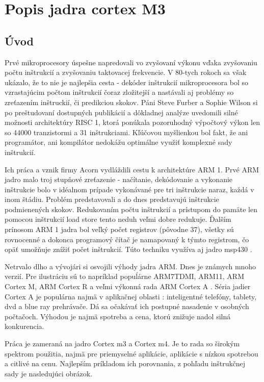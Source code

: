\chapter{Popis jadra cortex M3}
\section{Úvod}


Prvé mikroprocesory úspešne napredovali vo zvyšovaní výkonu vďaka zvyšovaniu počtu inštrukcií a zvyšovaniu taktovacej frekvencie. V 80-tych rokoch sa však ukázalo, že to nie je najlepšia cesta - dekóder inštrukcií mikroprocesora bol so vzrastajúcim počtom inštrukcií čoraz zložitejší a nastávali aj problémy so zreťazením inštruckií, či predikciou skokov. Páni Steve Furber a Sophie Wilson \cite{root_arm} si po preštudovaní dostupných publikácií a dôkladnej analýze uvedomili silné možnosti architektúry RISC 1, ktorá ponúkala pozoruhodný výpočtový výkon len so 44000 tranzistormi a 31 inštrukciami. Kľúčovou myšlienkou bol fakt, že ani programátor, ani kompilátor nedokážu optimálne využiť komplexné sady inštrukcií. 

Ich práca a vznik firmy Acorn vydláždili cestu k architektúre ARM 1. Prvé ARM jadro malo troj stupňové zreťazenie - načítanie, dekódovanie a vykonanie inštrukcie bolo v idéalnom prípade vykonávané pre tri inštrukcie naraz, každá v inom štádiu. Problém predstavovali a do dnes predstavujú inštrukcie podmienených skokov. Redukovaním počtu inštrukcií a prístupom do pamäte len pomocou inštrukcií load store tento neduh veľmi dobre redukuje. Ďalším prínosom ARM 1 jadra bol veľký počet registrov (pôvodne 37), všetky sú rovnocenné a dokonca programový čítač je namapovaný k týmto registrom, čo opäť umožňuje znížiť počet inštrukcií. Túto techniku využíva aj jadro msp430 \cite{msp430_mcu} .

Netrvalo dlho a vývojári si osvojili výhody jadra ARM. Dnes je známych mnoho verzií. Pre ilustráciu sú to napríklad popuĺárne ARM7TDMI, ARM11, ARM Cortex M, ARM Cortex R a veľmi výkonná rada ARM Cortex A \cite{arm_list} . Séria jadier Cortex A je populárna najmä v aplikačnej oblasti : inteligentné telefóny, tablety, dvd a blue ray prehrávače. Dá sa očakávať ich postupné nasadenie v osobných počtačoch. Výhodou je najmä spotreba a cena, ktorú znižuje nadol silná konkurencia.

Práca je zameraná na jadro Cortex m3 a Cortex m4. Je to rada so širokým spektrom použitia, najmä pre priemyselné aplikácie, aplikácie s nízkou spotrebou a citlivé na cenu. Najlepším príkladom ich porovnania, z pohľadu inštrukčnej sady je nasledujúci obrázok.

